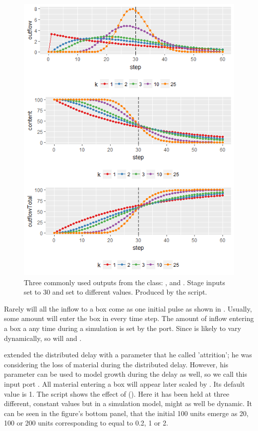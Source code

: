 \begin{figure} [ht]
\centering
\includegraphics[width=.9\textwidth]{graphics/phys-dev-1}
\caption{Three commonly used outputs from the  class: ,  and . Stage inputs  set to 30 and  set to different values. Produced by the  script.}
\label{fig:phys-dev-1}
\end{figure}


Rarely will all the inflow to a  box come as one initial pulse as shown in . Usually, some amount will enter the box in every time step. The amount of inflow entering a  box a any time during a simulation is set by the  port. Since  is likely to vary dynamically, so will  and .

\citet{Vansick77} extended the distributed delay with a parameter that he called 'attrition'; he was considering the loss of material during the distributed delay. However, his parameter can be used to model growth during the delay as well, so we call this input port . All material entering a  box will appear later scaled by . Its default value is 1. The  script shows the effect of  (). Here it has been held at three different, constant values but in a simulation model,  might as well be dynamic. It can be seen in the figure's bottom panel, that the initial 100 units emerge as 20, 100 or 200 units corresponding to  equal to 0.2, 1 or 2.

